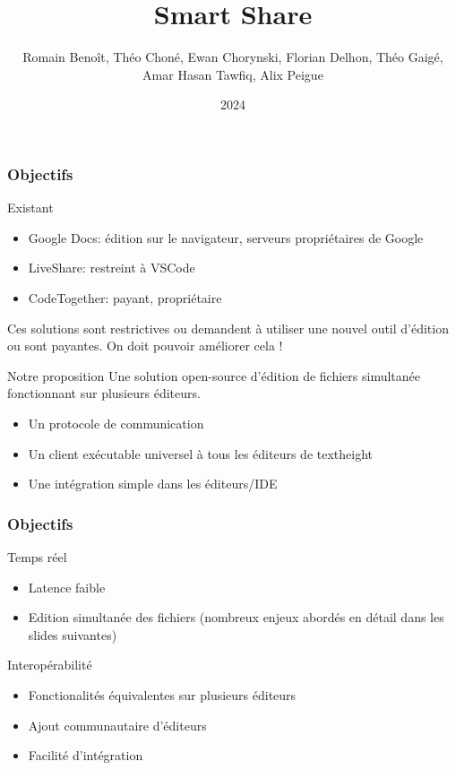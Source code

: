 \documentclass{beamer}
\title[Smart Share]{Smart Share}
\author[Blazanome]{Romain Benoît, Théo Choné, Ewan Chorynski, Florian Delhon, Théo Gaigé, Amar Hasan Tawfiq, Alix Peigue}
\institute[INSA Lyon]{INSA Lyon}
\date{2024}
\begin{document}
\frame{\titlepage}

\begin{frame}
    \frametitle{Objectifs}
    \begin{block}{Existant}
        \begin{itemize}
            \item Google Docs: édition sur le navigateur, serveurs propriétaires de Google
            \item LiveShare: restreint à VSCode
            \item CodeTogether: payant, propriétaire
        \end{itemize}
        Ces solutions sont restrictives ou demandent à utiliser une nouvel outil d'édition ou sont payantes.
        On doit pouvoir améliorer cela !
    \end{block}
    \begin{block}{Notre proposition}
        Une solution open-source d'édition de fichiers simultanée fonctionnant sur plusieurs éditeurs.
        \begin{itemize}
            \item Un protocole de communication
            \item Un client exécutable universel à tous les éditeurs de textheight
            \item Une intégration simple dans les éditeurs/IDE
        \end{itemize}
    \end{block}
\end{frame}

\begin{frame}
    \frametitle{Objectifs}
    \begin{block}{Temps réel}
        \begin{itemize}
            \item Latence faible
            \item Edition simultanée des fichiers (nombreux enjeux abordés en détail dans les slides suivantes)
        \end{itemize}
    \end{block}
    \begin{block}{Interopérabilité}
        \begin{itemize}
            \item Fonctionalités équivalentes sur plusieurs éditeurs
            \item Ajout communautaire d'éditeurs
            \item Facilité d'intégration
        \end{itemize}
    \end{block}
\end{frame}
\end{document}
